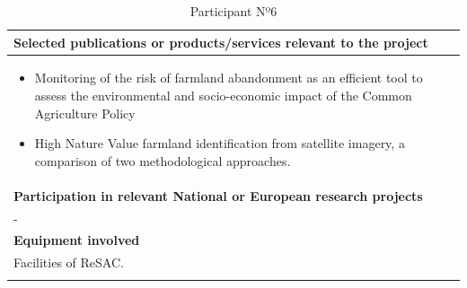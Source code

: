 \begin{longtable}[H]{|p{0.7cm}|p{4cm}|p{7cm}|p{1.3cm}|}
	\multicolumn{4}{|p{13cm}|}{\textbf{Selected publications or products/services relevant to the project}}  \\ \hline
	
	\multicolumn{4}{|p{14.5cm}|}{
		\begin{itemize}
			\item  Monitoring of the risk of farmland abandonment as an efficient tool to assess the environmental and socio-economic impact of the Common Agriculture Policy
			\item High Nature Value farmland identification from satellite imagery, a comparison of two methodological approaches.
		\end{itemize}	
      }  \\ \hline
	
	\multicolumn{4}{|p{13cm}|}{\textbf{Participation in relevant National or European research projects}}  \\ \hline
	
	\multicolumn{4}{|p{14.5cm}|}{-}  \\ \hline
	
	\multicolumn{4}{|p{13cm}|}{\textbf{Equipment involved}}  \\ \hline
	
	\multicolumn{4}{|p{14.5cm}|}{Facilities of ReSAC.}  \\ \hline
	\caption{Participant Nº6}
\end{longtable}

